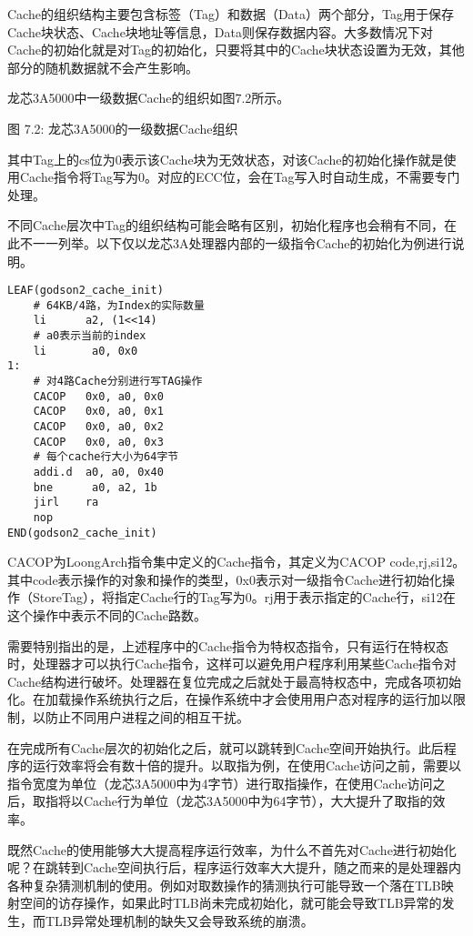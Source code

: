 \documentclass[]{ctexbook}
\begin{document}
Cache的组织结构主要包含标签（Tag）和数据（Data）两个部分，Tag用于保存Cache块状态、Cache块地址等信息，Data则保存数据内容。大多数情况下对Cache的初始化就是对Tag的初始化，只要将其中的Cache块状态设置为无效，其他部分的随机数据就不会产生影响。

龙芯3A5000中一级数据Cache的组织如图7.2所示。

图 7.2: 龙芯3A5000的一级数据Cache组织

其中Tag上的cs位为0表示该Cache块为无效状态，对该Cache的初始化操作就是使用Cache指令将Tag写为0。对应的ECC位，会在Tag写入时自动生成，不需要专门处理。

不同Cache层次中Tag的组织结构可能会略有区别，初始化程序也会稍有不同，在此不一一列举。以下仅以龙芯3A处理器内部的一级指令Cache的初始化为例进行说明。

\begin{verbatim}
LEAF(godson2_cache_init)
    # 64KB/4路，为Index的实际数量
    li      a2, (1<<14)
    # a0表示当前的index
    li       a0, 0x0
1:
    # 对4路Cache分别进行写TAG操作
    CACOP   0x0, a0, 0x0
    CACOP   0x0, a0, 0x1
    CACOP   0x0, a0, 0x2
    CACOP   0x0, a0, 0x3
    # 每个cache行大小为64字节
    addi.d  a0, a0, 0x40
    bne      a0, a2, 1b
    jirl    ra
    nop
END(godson2_cache_init)
\end{verbatim}

CACOP为LoongArch指令集中定义的Cache指令，其定义为CACOP code,rj,si12。其中code表示操作的对象和操作的类型，0x0表示对一级指令Cache进行初始化操作（StoreTag），将指定Cache行的Tag写为0。rj用于表示指定的Cache行，si12在这个操作中表示不同的Cache路数。

需要特别指出的是，上述程序中的Cache指令为特权态指令，只有运行在特权态时，处理器才可以执行Cache指令，这样可以避免用户程序利用某些Cache指令对Cache结构进行破坏。处理器在复位完成之后就处于最高特权态中，完成各项初始化。在加载操作系统执行之后，在操作系统中才会使用用户态对程序的运行加以限制，以防止不同用户进程之间的相互干扰。

在完成所有Cache层次的初始化之后，就可以跳转到Cache空间开始执行。此后程序的运行效率将会有数十倍的提升。以取指为例，在使用Cache访问之前，需要以指令宽度为单位（龙芯3A5000中为4字节）进行取指操作，在使用Cache访问之后，取指将以Cache行为单位（龙芯3A5000中为64字节），大大提升了取指的效率。

既然Cache的使用能够大大提高程序运行效率，为什么不首先对Cache进行初始化呢？在跳转到Cache空间执行后，程序运行效率大大提升，随之而来的是处理器内各种复杂猜测机制的使用。例如对取数操作的猜测执行可能导致一个落在TLB映射空间的访存操作，如果此时TLB尚未完成初始化，就可能会导致TLB异常的发生，而TLB异常处理机制的缺失又会导致系统的崩溃。
\end{document}
